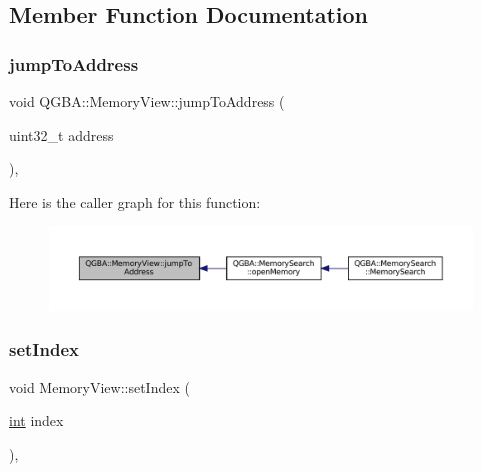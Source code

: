 \subsection{Member Function Documentation}
\mbox{\label{class_q_g_b_a_1_1_memory_view_aa3cdb87abcb60323bbf4a3dfe01d63e9}} 
\subsubsection{\texorpdfstring{jump\+To\+Address}{jumpToAddress}}
{\footnotesize\ttfamily void Q\+G\+B\+A\+::\+Memory\+View\+::jump\+To\+Address (\begin{DoxyParamCaption}\item[{uint32\+\_\+t}]{address }\end{DoxyParamCaption})\hspace{0.3cm}{\ttfamily [inline]}, {\ttfamily [slot]}}

Here is the caller graph for this function\+:
\nopagebreak
\begin{figure}[H]
\begin{center}
\leavevmode
\includegraphics[width=350pt]{class_q_g_b_a_1_1_memory_view_aa3cdb87abcb60323bbf4a3dfe01d63e9_icgraph}
\end{center}
\end{figure}
\mbox{\label{class_q_g_b_a_1_1_memory_view_a1006e186a3bd5335c02a59795713b2df}} 
\subsubsection{\texorpdfstring{set\+Index}{setIndex}}
{\footnotesize\ttfamily void Memory\+View\+::set\+Index (\begin{DoxyParamCaption}\item[{\mbox{\hyperlink{ioapi_8h_a787fa3cf048117ba7123753c1e74fcd6}{int}}}]{index }\end{DoxyParamCaption})\hspace{0.3cm}{\ttfamily [private]}, {\ttfamily [slot]}}

